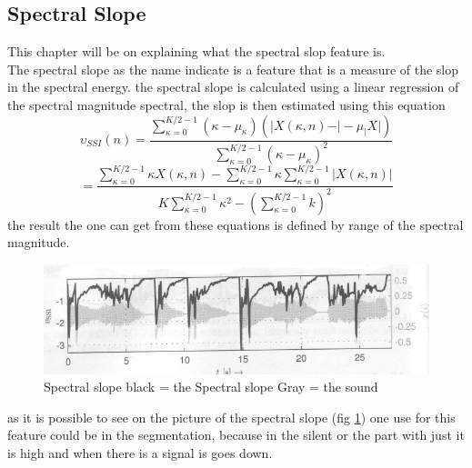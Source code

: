 \subsection{Spectral Slope}
This chapter will be on explaining what the spectral slop feature is.\\
The spectral slope as the name indicate is a feature that is a measure of the slop in the spectral energy\citep{ACA}. the spectral slope is calculated using a linear regression of the spectral magnitude spectral, the slop is then estimated using this equation\citep{ACA}
\begin{equation}
	\upsilon _{SSI} (n) = \frac{\displaystyle\sum_{\kappa = 0}^{K/2-1}(\kappa - \mu_\kappa)(\vert X(\kappa,n) - \vert - \mu_\vert X \vert)}{\displaystyle\sum_{\kappa = 0}^{K/2-1}(\kappa - \mu_\kappa)^2}
\end{equation}
\begin{equation}
	= \frac{\displaystyle\sum_{\kappa = 0}^{K/2-1}\kappa X(\kappa,n) - \displaystyle\sum_{\kappa = 0}^{K/2-1}\kappa\displaystyle\sum_{\kappa = 0}^{K/2-1}\vert X(\kappa,n)\vert}{K \displaystyle\sum_{\kappa = 0}^{K/2-1}\kappa^2-(\displaystyle\sum_{\kappa = 0}^{K/2-1}k)^2}
\end{equation}
the result the one can get from these equations is defined by range of the spectral magnitude.
\begin{figure}[h]
	\begin{center}
		\includegraphics[scale = 0.5]{fig/spectral_slope_fig.jpg}
		\caption{Spectral slope black = the Spectral slope Gray = the sound \citep{ACA}}
		\label{Spectral slope pic}
	\end{center}
\end{figure}
as it is possible to see on the picture of the spectral slope (fig \ref{Spectral slope pic}) one use for this feature could be in the segmentation, because in the silent or the part with just it is high and when there is a signal is goes down. 
